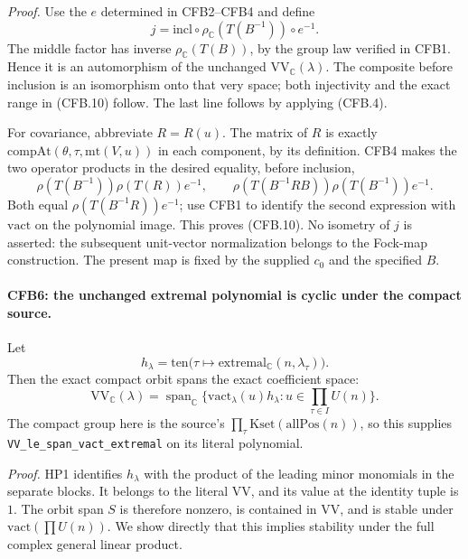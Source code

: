 \emph{Proof.}
Use the \(e\) determined in CFB2--CFB4 and define
\[
          j=\mathrm{incl}\circ
               \rho_{\mathbb C}(T(B^{-1}))\circ e^{-1}.
                                                               \tag{CFB.11}
\]
The middle factor has inverse \(\rho_{\mathbb C}(T(B))\), by
the group law verified in CFB1.  Hence it is an automorphism of
the unchanged \(\mathrm{VV}_{\mathbb C}(\lambda)\).
The composite before inclusion is an isomorphism onto that very
space; both injectivity and the exact range in (CFB.10) follow.
The last line follows by applying (CFB.4).

For covariance, abbreviate \(R=R(u)\).  The matrix of \(R\)
is exactly \(\mathrm{compAt}(\theta,\tau,\mathrm{mt}(V,u))\)
in each component, by its definition.  CFB4 makes the two operator
products in the desired equality, before inclusion,
\[
 \rho(T(B^{-1}))\rho(T(R))e^{-1},\qquad
 \rho(T(B^{-1}RB))\rho(T(B^{-1}))e^{-1}.
                                                               \tag{CFB.12}
\]
Both equal \(\rho(T(B^{-1}R))e^{-1}\); use CFB1 to identify
the second expression with \(\mathrm{vact}\) on the polynomial
image.  This proves (CFB.10).  No isometry of \(j\) is asserted:
the subsequent unit-vector normalization belongs to the Fock-map
construction.  The present map is fixed by the supplied \(c_0\)
and the specified \(B\).

\paragraph{CFB6: the unchanged extremal polynomial is cyclic under the compact source.}
\label{claim:CFB6}
Let
\[
 h_\lambda=\mathrm{ten}\bigl(\tau\mapsto
              \mathrm{extremal}_{\mathbb C}(n,\lambda_\tau)\bigr).
\]
Then the exact compact orbit spans the exact coefficient space:
\[
 \mathrm{VV}_{\mathbb C}(\lambda)
   =\operatorname{span}_{\mathbb C}
       \{\mathrm{vact}_\lambda(u)h_\lambda:
                                  u\in\prod_{\tau\in I}U(n)\}.
                                                               \tag{CFB.13}
\]
The compact group here is the source's
\(\prod_\tau\mathrm{Kset}(\mathrm{allPos}(n))\), so this supplies
\texttt{VV\_le\_span\_\allowbreak vact\_extremal} on its literal polynomial.

\emph{Proof.}
HP1 identifies \(h_\lambda\) with the product of the leading
minor monomials in the separate blocks.  It belongs to the literal
\(\mathrm{VV}\), and its value at the identity tuple is \(1\).
The orbit span \(S\) is therefore nonzero, is contained in
\(\mathrm{VV}\), and is stable under \(\mathrm{vact}(\prod U(n))\).
We show directly that this implies stability under the full complex
general linear product.

